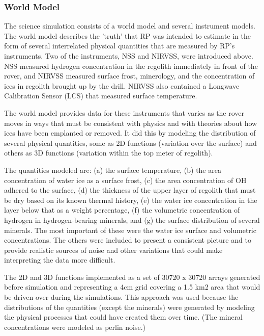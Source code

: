 \documentclass[twocolumn,letterpaper]{IEEEAerospaceCLS}  %
\begin{document}
\subsubsection{World Model}
The science simulation consists of a world model and several instrument models.  
The world model describes the 'truth' that RP was intended to estimate in the form of several interrelated physical quantities that are measured by RP's instruments.  
Two of the instruments, NSS and NIRVSS, were introduced above.  
NSS measured hydrogen concentration in the regolith immediately in front of the rover, and NIRVSS measured surface frost, minerology, and the concentration of ices in regolith brought up by the drill.  
NIRVSS also contained a Longwave Calibration Sensor (LCS) that measured surface temperature.

The world model provides data for these instruments that varies as the rover moves in ways that must be consistent with physics and with theories about how ices have been emplanted or removed.  
It did this by modeling the distribution of several physical quantities, some as 2D functions (variation over the surface) and others as 3D functions (variation within the top meter of regolith).

The quantities modeled are: (a) the surface temperature, (b) the area concentration of water ice as a surface frost, (c) the area concentration of OH adhered to the surface, (d) the thickness of the upper layer of regolith that must be dry based on its known thermal history, (e) the water ice concentration in the layer below that as a weight percentage, (f) the volumetric concentration of hydrogen in hydrogen-bearing minerals, and (g) the surface distribution of several minerals.  
The most important of these were the water ice surface and volumetric concentrations.  
The others were included to present a consistent picture and to provide realistic sources of noise and other variations that could make interpreting the data more difficult.

The 2D and 3D functions implemented as a set of 30720 x 30720 arrays generated before simulation and representing a 4cm grid covering a 1.5 km2 area that would be driven over during the simulations.  
This approach was used because the distributions of the quantities (except the minerals) were generated by modeling the physical processes that could have created them over time.  
(The mineral concentrations were modeled as perlin noise.)
\end{document}

